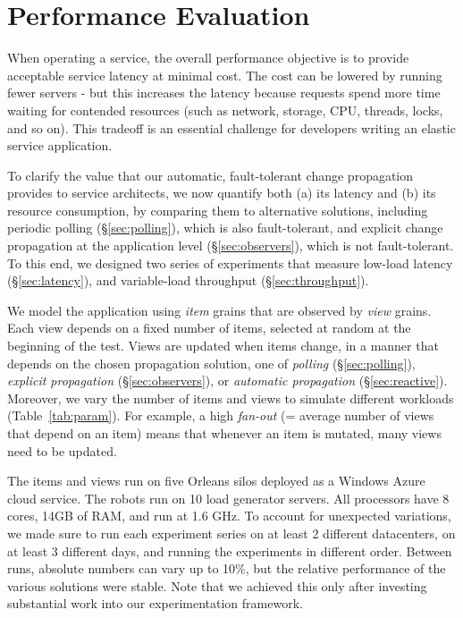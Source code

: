 \section{Performance Evaluation}\label{sec:evaluation}

When operating a service, the overall performance objective is to provide acceptable service latency at minimal cost. The cost can be lowered by running fewer servers - but this increases the latency because requests spend more time waiting for contended resources (such as network, storage, CPU, threads, locks, and so on). This tradeoff is an essential challenge for developers writing an elastic service application. 

To clarify the value that our automatic, fault-tolerant change propagation provides to service architects, we now quantify both (a) its latency and (b) its resource consumption, by comparing them to alternative solutions, including periodic polling (\S\ref{sec:polling}), which is also fault-tolerant, and explicit change propagation at the application level (\S\ref{sec:observers}), which is not fault-tolerant. To this end, we designed two series of experiments that measure low-load latency (\S\ref{sec:latency}), and variable-load throughput (\S\ref{sec:throughput}).

We model the application using  \emph{item} grains that are observed by \emph{view} grains. Each view depends on a fixed number of items, selected at random at the beginning of the test. Views are updated when items change, in a manner that depends on the chosen propagation solution, one of \emph{polling} (\S\ref{sec:polling}), \emph{explicit propagation} (\S\ref{sec:observers}), or \emph{automatic propagation} (\S\ref{sec:reactive}). Moreover, we vary the number of items and views to simulate different workloads (Table~\ref{tab:param}).  For example, a high \emph{fan-out} (= average number of views that depend on an item) means that whenever an item is mutated, many views need to be updated. 

The items and views run on five Orleans silos deployed as a Windows Azure cloud service. The robots run on 10 load generator servers. All processors have 8 cores, 14GB of RAM, and run at 1.6 GHz. To account for unexpected variations, we made sure to run each experiment series on at least 2 different datacenters, on at least 3 different days, and running the experiments in different order. Between runs, absolute numbers can vary up to 10\%, but the relative performance of the various solutions were stable. Note that we achieved this only after investing substantial work into our experimentation framework. 

